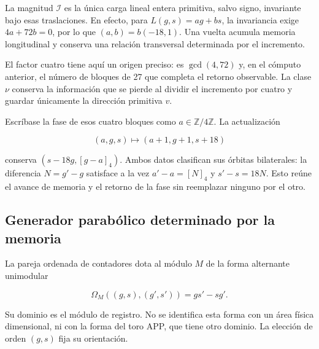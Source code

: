 La magnitud \(\mathcal I\) es la única carga lineal entera primitiva, salvo signo, invariante bajo esas traslaciones. En efecto, para \(L(g,s)=ag+bs\), la invariancia exige \(4a+72b=0\), por lo que \((a,b)=b(-18,1)\). Una vuelta acumula memoria longitudinal y conserva una relación transversal determinada por el incremento.

El factor cuatro tiene aquí un origen preciso: es \(\gcd(4,72)\) y, en el cómputo anterior, el número de bloques de 27 que completa el retorno observable. La clase \(\nu\) conserva la información que se pierde al dividir el incremento por cuatro y guardar únicamente la dirección primitiva \(v\).

\begin{corollary}

Escríbase la fase de esos cuatro bloques como \(a\in\mathbb Z/4\mathbb Z\). La actualización

\[
(a,g,s)\longmapsto(a+1,g+1,s+18)
\]

conserva \((s-18g,[g-a]_4)\). Ambos datos clasifican sus órbitas bilaterales: la diferencia \(N=g'-g\) satisface a la vez \(a'-a=[N]_4\) y \(s'-s=18N\). Esto reúne el avance de memoria y el retorno de la fase sin reemplazar ninguno por el otro.
\end{corollary}

\subsection{Generador parabólico determinado por la memoria}

La pareja ordenada de contadores dota al módulo \(M\) de la forma alternante unimodular

\[
\Omega_M((g,s),(g',s'))=gs'-sg'.
\]

Su dominio es el módulo de registro. No se identifica esta forma con un área física dimensional, ni con la forma del toro APP, que tiene otro dominio. La elección de orden \((g,s)\) fija su orientación.


